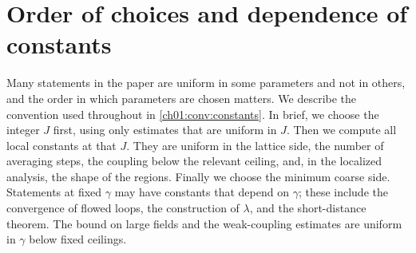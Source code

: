\section{Order of choices and dependence of constants}\label{s3:constants}

Many statements in the paper are uniform in some parameters and not in others, and the order in which parameters are chosen matters. We describe the convention used throughout in \cref{ch01:conv:constants}. In brief, we choose the integer $J$ first, using only estimates that are uniform in $J$. Then we compute all local constants at that $J$. They are uniform in the lattice side, the number of averaging steps, the coupling below the relevant ceiling, and, in the localized analysis, the shape of the regions. Finally we choose the minimum coarse side. Statements at fixed $\gamma$ may have constants that depend on $\gamma$; these include the convergence of flowed loops, the construction of $\lambda$, and the short-distance theorem. The bound on large fields and the weak-coupling estimates are uniform in $\gamma$ below fixed ceilings.
